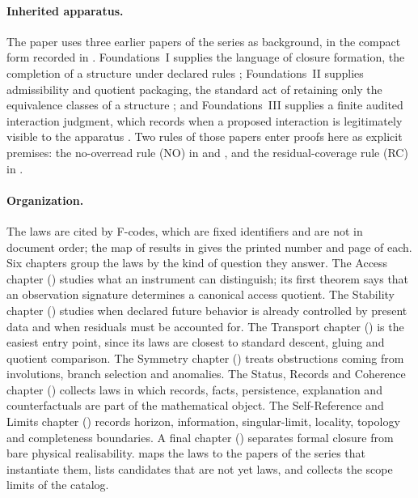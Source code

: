 \paragraph{Inherited apparatus.}
The paper uses three earlier papers of the series as background, in
the compact form recorded in .  Foundations~I
supplies the language of closure formation, the completion of a
structure under declared rules \citep{Tsiokos2026EmergenceCalculus};
Foundations~II supplies admissibility and quotient packaging, the
standard act of retaining only the equivalence classes of a structure
\citep{Tsiokos2026FoundationsII}; and Foundations~III supplies a finite
audited interaction judgment, which records when a proposed interaction
is legitimately visible to the apparatus
\citep{Tsiokos2026FoundationsIII}.  Two rules of those papers enter
proofs here as explicit premises: the no-overread rule (NO) in
 and , and the residual-coverage rule (RC) in
.

\paragraph{Organization.}
The laws are cited by F-codes, which are fixed identifiers and are not
in document order; the map of results in 
gives the printed number and page of each.  Six chapters group the laws
by the kind of question they answer.  The Access chapter
() studies what an instrument can distinguish; its
first theorem says that an observation signature determines a canonical
access quotient.  The Stability chapter () studies
when declared future behavior is already controlled by present data and
when residuals must be accounted for.  The Transport chapter
() is the easiest entry point, since its laws are
closest to standard descent, gluing and quotient comparison.  The
Symmetry chapter () treats obstructions coming from
involutions, branch selection and anomalies.  The Status, Records and
Coherence chapter () collects laws
in which records, facts, persistence, explanation and counterfactuals
are part of the mathematical object.  The Self-Reference and Limits
chapter () records horizon,
information, singular-limit, locality, topology and completeness
boundaries.  A final chapter ()
separates formal closure from bare physical realisability.
 maps the laws to the papers of the series
that instantiate them,  lists candidates that are not
yet laws, and  collects the scope limits of the
catalog.

